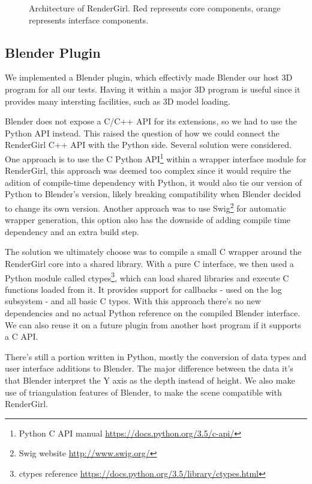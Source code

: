 \documentclass{vgtc}
\begin{document}
\begin{figure}
\centering

\caption{Architecture of RenderGirl. Red represents core components,
  orange represents interface components.}
\label{fig:architecture}
\end{figure}

\subsection{Blender Plugin}

We implemented a Blender plugin, which effectivly made Blender our
host 3D program for all our tests. Having it within a major 3D program
is useful since it provides many intersting facilities, such as 3D
model loading.

Blender does not expose a C/C++ API for its extensions, so we had to
use the Python API instead. This raised the question of how we could
connect the RenderGirl C++ API with the Python side. Several solution
were considered. One approach is to use the C Python
API\footnote{Python C API manual
  \url{https://docs.python.org/3.5/c-api/}} within a wrapper interface
module for RenderGirl, this approach was deemed too complex since it
would require the adition of compile-time dependency with Python, it
would also tie our version of Python to Blender's version, likely
breaking compatibility when Blender decided to change its own
version. Another approach was to use Swig\footnote{Swig website
  \url{http://www.swig.org/}} for automatic wrapper generation, this
option also has the downside of adding compile time dependency and an
extra build step.

The solution we ultimately choose was to compile a small C wrapper
around the RenderGirl core into a shared library. With a pure C
interface, we then used a Python module called ctypes\footnote{ctypes
  reference \url{https://docs.python.org/3.5/library/ctypes.html}},
which can load shared libraries and execute C functions loaded from
it. It provides support for callbacks - used on the log subsystem -
and all basic C types. With this approach there's no new dependencies
and no actual Python reference on the compiled Blender interface. We
can also reuse it on a future plugin from another host program if it
supports a C API.

There's still a portion written in Python, mostly the conversion of
data types and user interface additions to Blender. The major
difference between the data it's that Blender interpret the Y axis as
the depth instead of height. We also make use of triangulation
features of Blender, to make the scene compatible with RenderGirl.
\end{document}
